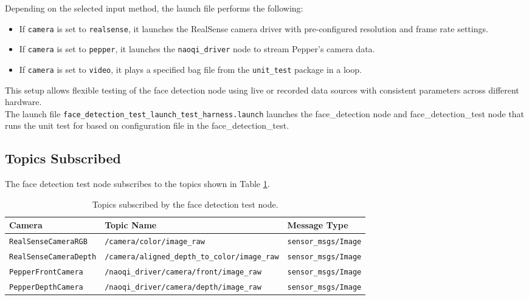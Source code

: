 \documentclass{CSSRforAfrica}
\begin{document}
{Depending on the selected input method, the launch file performs the following:

\begin{itemize}
	\item If \texttt{camera} is set to \texttt{realsense}, it launches the RealSense camera driver with pre-configured resolution and frame rate settings.
	\item If \texttt{camera} is set to \texttt{pepper}, it launches the \texttt{naoqi\_driver} node to stream Pepper’s camera data.
	\item If \texttt{camera} is set to \texttt{video}, it plays a specified bag file from the \texttt{unit\_test} package in a loop.
\end{itemize}

This setup allows flexible testing of the face detection node using live or recorded data sources with consistent parameters across different hardware.\\

The launch file \texttt{face\_detection\_test\_launch\_test\_harness.launch} launches the face\_detection node and face\_detection\_test node that runs the unit test for based on configuration file in the face\_detection\_test.

\subsection*{Topics Subscribed}
The face detection test node subscribes to the topics shown in Table \ref{Table: topics subscribed test node}.

\begin{table}[!h]
	\centering
	{\fontsize{9.0}{12.0}\selectfont %
		\begin{tabularx}{\linewidth}{| l | l | X |}
			\hline
			\rowcolor{blue!20}
			\textbf{Camera} & \textbf{Topic Name} & \textbf{Message Type} \\
			\hline
			\texttt{RealSenseCameraRGB} & \texttt{/camera/color/image\_raw} & \texttt{sensor\_msgs/Image} \\
			\hline
			\texttt{RealSenseCameraDepth} & \texttt{/camera/aligned\_depth\_to\_color/image\_raw} & \texttt{sensor\_msgs/Image} \\
			\hline
			\texttt{PepperFrontCamera} & \texttt{/naoqi\_driver/camera/front/image\_raw} & \texttt{sensor\_msgs/Image} \\
			\hline
			\texttt{PepperDepthCamera} & \texttt{/naoqi\_driver/camera/depth/image\_raw} & \texttt{sensor\_msgs/Image} \\
			\hline
		\end{tabularx}
	}
	\caption{Topics subscribed by the face detection test node.}
	\label{Table: topics subscribed test node}
\end{table}

}
\end{document}
